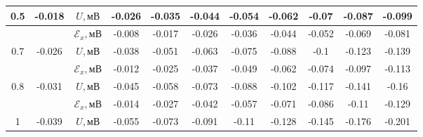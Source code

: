 \documentclass[a4paper, 12pt]{article}
\begin{document}
\begin{table}[H]
{\begin{tabular}{|c|c|c|c|c|c|c|c|c|c|c|}
{\color[HTML]{656565} 0.5}        & {\color[HTML]{656565} -0.018}       & {\color[HTML]{656565} $U, \text{мВ}$}             & {\color[HTML]{656565} -0.026} & {\color[HTML]{656565} -0.035} & {\color[HTML]{656565} -0.044} & {\color[HTML]{656565} -0.054} & {\color[HTML]{656565} -0.062} & {\color[HTML]{656565} -0.07}  & {\color[HTML]{656565} -0.087} & {\color[HTML]{656565} -0.099} \\ \hline
{\color[HTML]{656565} }           & {\color[HTML]{656565} }             & {\color[HTML]{656565} $\mathscr{E}_x, \text{мВ}$} & {\color[HTML]{656565} -0.008} & {\color[HTML]{656565} -0.017} & {\color[HTML]{656565} -0.026} & {\color[HTML]{656565} -0.036} & {\color[HTML]{656565} -0.044} & {\color[HTML]{656565} -0.052} & {\color[HTML]{656565} -0.069} & {\color[HTML]{656565} -0.081} \\ \hline
{\color[HTML]{FFCB2F} 0.7}        & {\color[HTML]{FFCB2F} -0.026}       & {\color[HTML]{FFCB2F} $U, \text{мВ}$}             & {\color[HTML]{FFCB2F} -0.038} & {\color[HTML]{FFCB2F} -0.051} & {\color[HTML]{FFCB2F} -0.063} & {\color[HTML]{FFCB2F} -0.075} & {\color[HTML]{FFCB2F} -0.088} & {\color[HTML]{FFCB2F} -0.1}   & {\color[HTML]{FFCB2F} -0.123} & {\color[HTML]{FFCB2F} -0.139} \\ \hline
{\color[HTML]{FFCB2F} }           & {\color[HTML]{FFCB2F} }             & {\color[HTML]{FFCB2F} $\mathscr{E}_x, \text{мВ}$} & {\color[HTML]{FFCB2F} -0.012} & {\color[HTML]{FFCB2F} -0.025} & {\color[HTML]{FFCB2F} -0.037} & {\color[HTML]{FFCB2F} -0.049} & {\color[HTML]{FFCB2F} -0.062} & {\color[HTML]{FFCB2F} -0.074} & {\color[HTML]{FFCB2F} -0.097} & {\color[HTML]{FFCB2F} -0.113} \\ \hline
{\color[HTML]{3531FF} 0.8}        & {\color[HTML]{3531FF} -0.031}       & {\color[HTML]{3531FF} $U, \text{мВ}$}             & {\color[HTML]{3531FF} -0.045} & {\color[HTML]{3531FF} -0.058} & {\color[HTML]{3531FF} -0.073} & {\color[HTML]{3531FF} -0.088} & {\color[HTML]{3531FF} -0.102} & {\color[HTML]{3531FF} -0.117} & {\color[HTML]{3531FF} -0.141} & {\color[HTML]{3531FF} -0.16}  \\ \hline
{\color[HTML]{3531FF} }           & {\color[HTML]{3531FF} }             & {\color[HTML]{3531FF} $\mathscr{E}_x, \text{мВ}$} & {\color[HTML]{3531FF} -0.014} & {\color[HTML]{3531FF} -0.027} & {\color[HTML]{3531FF} -0.042} & {\color[HTML]{3531FF} -0.057} & {\color[HTML]{3531FF} -0.071} & {\color[HTML]{3531FF} -0.086} & {\color[HTML]{3531FF} -0.11}  & {\color[HTML]{3531FF} -0.129} \\ \hline
1                                 & -0.039                              & $U, \text{мВ}$                                    & -0.055                        & -0.073                        & -0.091                        & -0.11                         & -0.128                        & -0.145                        & -0.176                        & -0.201                        \\ \hline

\end{tabular}}
\end{table}
\end{document}

